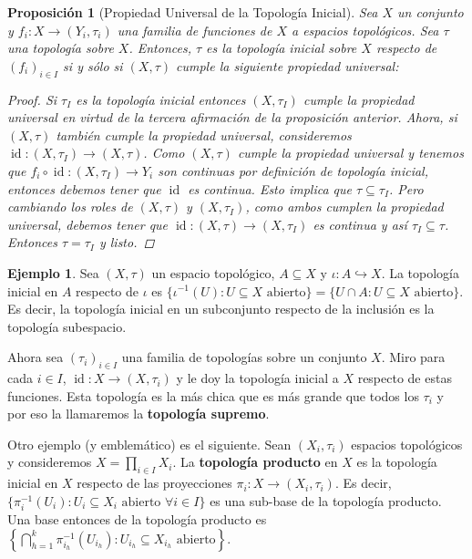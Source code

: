 \documentclass[12pt]{book}
\newtheorem{prop}[teo]{Proposición}
\theoremstyle{definition}
\newtheorem{ex}[teo]{Ejemplo}
\DeclareMathOperator{\id}{id}
\begin{document}
\begin{prop}[Propiedad Universal de la Topología Inicial]
Sea $X$ un conjunto y $f_i:X\to (Y_i,\tau_i)$ una familia de funciones de $X$ a espacios topológicos. Sea $\tau$ una topología sobre $X$. Entonces, $\tau$ es la topología inicial sobre $X$ respecto de $(f_i)_{i\in I}$ si y sólo si $(X,\tau)$ cumple la siguiente propiedad universal:

\begin{center}
\end{center}
\begin{proof}
Si $\tau_I$ es la topología inicial entonces $(X,\tau_{I})$ cumple la propiedad universal en virtud de la tercera afirmación de la proposición anterior. Ahora, si $(X,\tau)$ también cumple la propiedad universal, consideremos $\id: (X,\tau_I)\to (X,\tau)$. Como $(X,\tau)$ cumple la propiedad universal y tenemos que $f_i\circ \id:(X,\tau_I)\to Y_i$ son continuas por definición de topología inicial, entonces debemos tener que $\id$ es continua. Esto implica que $\tau\subseteq \tau_I$. Pero cambiando los roles de $(X,\tau)$ y $(X,\tau_I)$, como ambos cumplen la propiedad universal, debemos tener que $\id: (X,\tau)\to (X,\tau_I)$ es continua y así $\tau_I\subseteq \tau$. Entonces $\tau = \tau_I$ y listo.
\end{proof}
\end{prop}

\begin{ex}
Sea $(X,\tau)$ un espacio topológico, $A\subseteq X$ y $\iota :A\hookrightarrow X$. La topología inicial en $A$ respecto de $\iota$ es $\{\iota^{-1}(U) : U\subseteq X \text{ abierto}\} = \{U\cap A : U\subseteq X \text{ abierto}\}$. Es decir, la topología inicial en un subconjunto respecto de la inclusión es la topología subespacio.

Ahora sea $(\tau_i)_{i\in I}$ una familia de topologías sobre un conjunto $X$. Miro para cada $i\in I$, $\id:X\to (X,\tau_i)$ y le doy la topología inicial a $X$ respecto de estas funciones. Esta topología es la más chica que es más grande que todos los $\tau_i$ y por eso la llamaremos la \textbf{topología supremo}.

Otro ejemplo (y emblemático) es el siguiente. Sean $(X_i,\tau_i)$ espacios topológicos y consideremos $X=\displaystyle\prod_{i\in I}X_i$. La \textbf{topología producto} en $X$ es la topología inicial en $X$ respecto de las proyecciones $\pi_i: X\to (X_i,\tau_i)$. Es decir, $\{\pi_i^{-1}(U_i) : U_i\subseteq X_i \text{ abierto } \forall i\in I\}$ es una sub-base de la topología producto. Una base entonces de la topología producto es $\left\{ \displaystyle\bigcap_{h=1}^k \pi_{i_h}^{-1}(U_{i_h}) : U_{i_h}\subseteq X_{i_h} \text{ abierto} \right\}$.
\end{ex}
\end{document}
